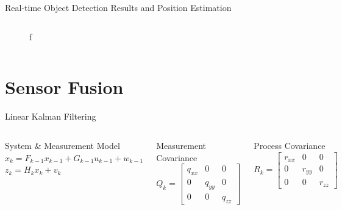 \documentclass[10pt]{beamer}
\begin{document}
\begin{frame}{Real-time Object Detection Results and Position Estimation}
\begin{columns}
\begin{figure}
         \caption{f}
     \end{figure}  
\end{columns}     
\end{frame}



\section{Sensor Fusion}

\begin{frame}{Linear Kalman Filtering}
   \begin{columns}
        \begin{block}{System \& Measurement Model}
          \centering
          $x_{k}=F_{k-1} x_{k-1}+G_{k-1} u_{k-1}+w_{k-1}$\\
          $z_{k}=H_{k} x_{k}+v_{k}$ 
        \end{block}
        \begin{block}{Measurement Covariance}
              $$Q_{k} = 
                 \left[\begin{array}{ccc}
                      q_{xx} & 0 & 0 \\
                      0 & q_{yy} & 0 \\
                      0 & 0 & q_{zz}
                      \end{array}\right]$$
        \end{block}
        \begin{block}{Process Covariance}
              $$    R_{k} =
                    \left[\begin{array}{ccc}
                          r_{xx} & 0 & 0 \\
                          0 & r_{yy} & 0 \\
                          0 & 0 & r_{zz}
                          \end{array}\right]$$
        \end{block}  
        

\end{columns}
\end{frame}
\end{document}
